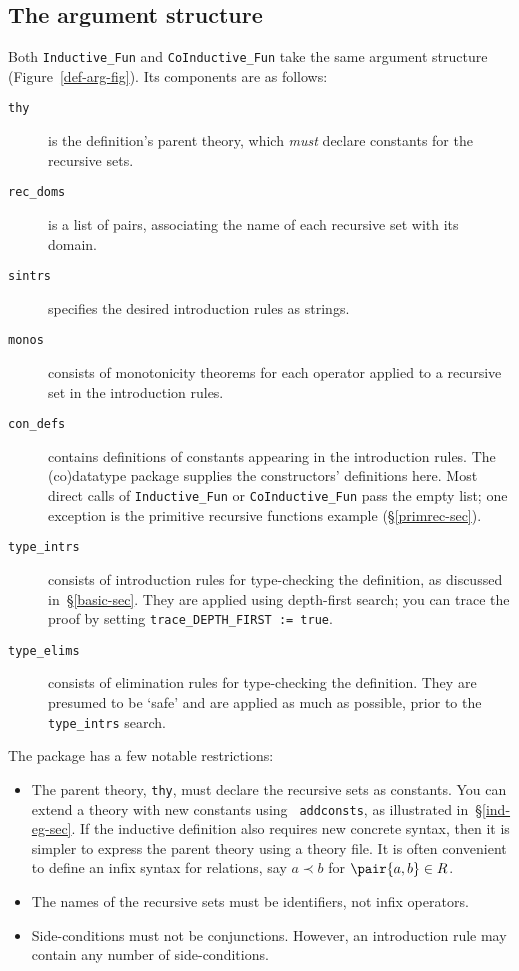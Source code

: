 \subsection{The argument structure}
Both \verb|Inductive_Fun| and \verb|CoInductive_Fun| take the same argument
structure (Figure~\ref{def-arg-fig}).  Its components are as follows:
\begin{description}
\item[\tt thy] is the definition's parent theory, which {\it must\/}
declare constants for the recursive sets.

\item[\tt rec\_doms] is a list of pairs, associating the name of each recursive
set with its domain.

\item[\tt sintrs] specifies the desired introduction rules as strings.

\item[\tt monos] consists of monotonicity theorems for each operator applied
to a recursive set in the introduction rules.

\item[\tt con\_defs] contains definitions of constants appearing in the
introduction rules.  The (co)datatype package supplies the constructors'
definitions here.  Most direct calls of \verb|Inductive_Fun| or
\verb|CoInductive_Fun| pass the empty list; one exception is the primitive
recursive functions example (\S\ref{primrec-sec}).

\item[\tt type\_intrs] consists of introduction rules for type-checking the
  definition, as discussed in~\S\ref{basic-sec}.  They are applied using
  depth-first search; you can trace the proof by setting
  \verb|trace_DEPTH_FIRST := true|.

\item[\tt type\_elims] consists of elimination rules for type-checking the
definition.  They are presumed to be `safe' and are applied as much as
possible, prior to the {\tt type\_intrs} search.
\end{description}
The package has a few notable restrictions:
\begin{itemize}
\item The parent theory, {\tt thy}, must declare the recursive sets as
  constants.  You can extend a theory with new constants using {\tt
    addconsts}, as illustrated in~\S\ref{ind-eg-sec}.  If the inductive
  definition also requires new concrete syntax, then it is simpler to
  express the parent theory using a theory file.  It is often convenient to
  define an infix syntax for relations, say $a\prec b$ for $\pair{a,b}\in
  R$.

\item The names of the recursive sets must be identifiers, not infix
operators.  

\item Side-conditions must not be conjunctions.  However, an introduction rule
may contain any number of side-conditions.
\end{itemize}


